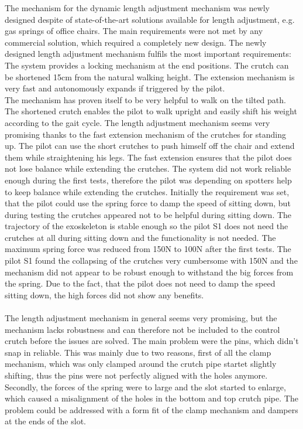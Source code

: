 \documentclass[conference,a4paper]{IEEEtran}
\begin{document}
The mechanism for the dynamic length adjustment mechanism was newly designed despite of state-of-the-art solutions available for length adjustment, e.g. gas springs of office chairs. The main requirements were not met by any commercial solution, which required a completely new design.
The newly designed length adjustment mechanism fulfils the most important requirements: The system provides a locking mechanism at the end positions. The crutch can be shortened 15cm from the natural walking height. The extension mechanism is very fast and autonomously expands if triggered by the pilot.\\

The mechanism has proven itself to be very helpful to walk on the tilted path. The shortened crutch enables the pilot to walk upright and easily shift his weight according to the gait cycle.
The length adjustment mechanism seems very promising thanks to the fast extension mechanism of the crutches for standing up. The pilot can use the short crutches to push himself off the chair and extend them while straightening his legs. The fast extension ensures that the pilot does not lose balance while extending the crutches. The system did not work reliable enough during the first tests, therefore the pilot was depending on spotters help to keep balance while extending the crutches.
Initially the requirement was set, that the pilot could use the spring force to damp the speed of sitting down, but during testing the crutches appeared not to be helpful during sitting down. The trajectory of the exoskeleton is stable enough so the pilot S1 does not need the crutches at all during sitting down and the functionality is not needed.
The maximum spring force was reduced from 150N to 100N after the first tests. The pilot S1 found the collapsing of the crutches very cumbersome with 150N and the mechanism did not appear to be robust enough to withstand the big forces from the spring. Due to the fact, that the pilot does not need to damp the speed sitting down, the high forces did not show any benefits. \\
\\
The length adjustment mechanism in general seems very promising, but the mechanism lacks robustness and can therefore not be included to the control crutch before the issues are solved. The main problem were the pins, which didn't snap in reliable. This was mainly due to two reasons, first of all the clamp mechanism, which was only clamped around the crutch pipe startet slightly shifting, thus the pins were not perfectly aligned with the holes anymore. Secondly, the forces of the spring were to large and the slot started to enlarge, which caused a misalignment of the holes in the bottom and top crutch pipe. The problem could be addressed with a form fit of the clamp mechanism and dampers at the ends of the slot.\\
\end{document}
